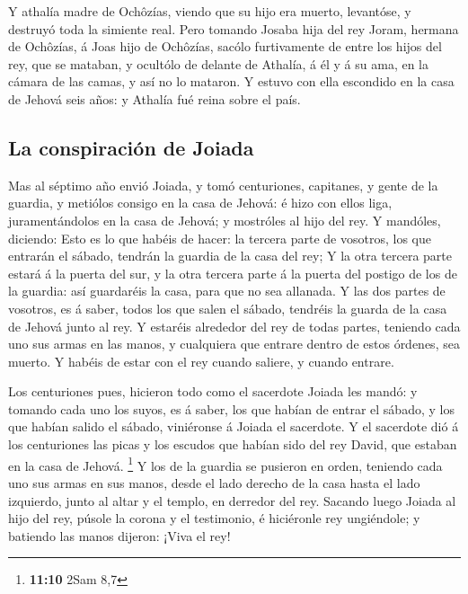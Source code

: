  Y athalía madre de Ochôzías, viendo que su hijo era muerto,
levantóse, y destruyó toda la simiente real.  Pero tomando
Josaba hija del rey Joram, hermana de Ochôzías, á Joas hijo de Ochôzías,
sacólo furtivamente de entre los hijos del rey, que se mataban, y
ocultólo de delante de Athalía, á él y á su ama, en la cámara de las
camas, y así no lo mataron.  Y estuvo con ella escondido en
la casa de Jehová seis años: y Athalía fué reina sobre el país.

\hypertarget{la-conspiraciuxf3n-de-joiada}{%
\subsection{La conspiración de
Joiada}\label{la-conspiraciuxf3n-de-joiada}}

 Mas al séptimo año envió Joiada, y tomó centuriones,
capitanes, y gente de la guardia, y metiólos consigo en la casa de
Jehová: é hizo con ellos liga, juramentándolos en la casa de Jehová; y
mostróles al hijo del rey.  Y mandóles, diciendo: Esto es lo
que habéis de hacer: la tercera parte de vosotros, los que entrarán el
sábado, tendrán la guardia de la casa del rey;  Y la otra
tercera parte estará á la puerta del sur, y la otra tercera parte á la
puerta del postigo de los de la guardia: así guardaréis la casa, para
que no sea allanada.  Y las dos partes de vosotros, es á
saber, todos los que salen el sábado, tendréis la guarda de la casa de
Jehová junto al rey.  Y estaréis alrededor del rey de todas
partes, teniendo cada uno sus armas en las manos, y cualquiera que
entrare dentro de estos órdenes, sea muerto. Y habéis de estar con el
rey cuando saliere, y cuando entrare.

 Los centuriones pues, hicieron todo como el sacerdote
Joiada les mandó: y tomando cada uno los suyos, es á saber, los que
habían de entrar el sábado, y los que habían salido el sábado,
viniéronse á Joiada el sacerdote.  Y el sacerdote dió á los
centuriones las picas y los escudos que habían sido del rey David, que
estaban en la casa de Jehová. \footnote{\textbf{11:10} 2Sam 8,7}
 Y los de la guardia se pusieron en orden, teniendo cada
uno sus armas en sus manos, desde el lado derecho de la casa hasta el
lado izquierdo, junto al altar y el templo, en derredor del rey.
 Sacando luego Joiada al hijo del rey, púsole la corona y
el testimonio, é hiciéronle rey ungiéndole; y batiendo las manos
dijeron: ¡Viva el rey!

